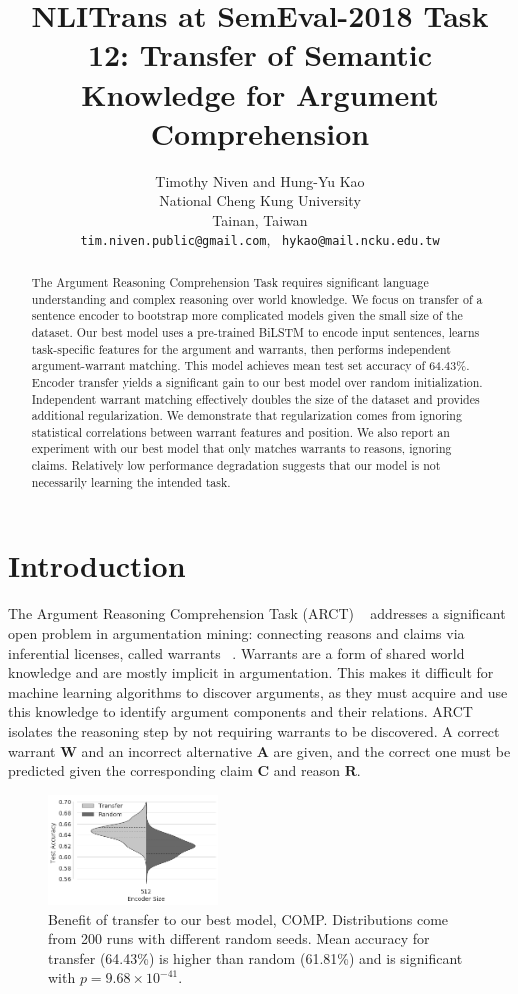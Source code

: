 \documentclass[11pt,a4paper]{article}
\title{NLITrans at SemEval-2018 Task 12: Transfer of Semantic Knowledge for Argument Comprehension}
\author{Timothy Niven {\normalfont and} Hung-Yu Kao \\
  National Cheng Kung University \\
  Tainan, Taiwan \\
  {\tt tim.niven.public@gmail.com}, \ {\tt hykao@mail.ncku.edu.tw}}
\date{}
\begin{document}
\maketitle
\begin{abstract}
  The Argument Reasoning Comprehension Task requires significant language understanding 
    and complex reasoning over world knowledge.
  We focus on transfer of a sentence encoder to bootstrap more complicated models
    given the small size of the dataset.
  Our best model uses a pre-trained BiLSTM to encode input sentences, 
    learns task-specific features for the argument and warrants,
    then performs independent argument-warrant matching.
  This model achieves mean test set accuracy of 64.43\%.
  Encoder transfer yields a significant gain to our best model over random initialization.
  Independent warrant matching effectively doubles the size of the dataset 
    and provides additional regularization.
  We demonstrate that regularization comes from ignoring statistical correlations 
    between warrant features and position.
  We also report an experiment with our best model that only matches warrants to reasons, ignoring claims.
  Relatively low performance degradation suggests that 
    our model is not necessarily learning the intended task.
\end{abstract}

\section{Introduction}

The Argument Reasoning Comprehension Task (ARCT) ~\cite{habernal.et.al.2018.NAACL.arct} addresses a significant open problem in argumentation mining: 
  connecting reasons and claims via inferential licenses, called warrants ~\cite{Toulmin:1958}.
Warrants are a form of shared world knowledge and are mostly implicit in argumentation.
This makes it difficult for machine learning algorithms to discover arguments,
  as they must acquire and use this knowledge to identify argument components and their relations.
ARCT isolates the reasoning step by not requiring warrants to be discovered.
A correct warrant $\mathbf{W}$ and an incorrect alternative $\mathbf{A}$ are given, 
  and the correct one must be predicted given the corresponding claim $\mathbf{C}$ and reason $\mathbf{R}$.

\begin{figure}[t]
\centering
\includegraphics[width=0.4\textwidth]{trans.png}
\caption{Benefit of transfer to our best model, COMP.
Distributions come from 200 runs with different random seeds.
Mean accuracy for transfer (64.43\%) is higher than random (61.81\%)
  and is significant with $p = 9.68 \times 10^{-41}$.}
\end{figure}
\end{document}
